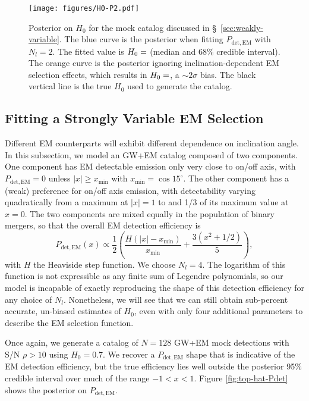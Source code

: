 \documentclass[modern]{aastex631}
\newcommand{\detected}{\mathrm{det}}
\newcommand{\EM}{\mathrm{EM}}
\begin{document}
\begin{figure}
    \texttt{[image: figures/H0-P2.pdf]}
    \caption{Posterior on $H_0$ for the mock catalog discussed in \S\,
    \ref{sec:weakly-variable}.  The blue curve is the posterior when fitting
    $P_{\detected,\EM}$ with $N_l = 2$.  The fitted value is $H_0 =
    \variable{output/H0-P2.txt}$ (median and 68\% credible interval).  The
    orange curve is the posterior ignoring inclination-dependent EM selection
    effects, which results in $H_0 = \variable{output/H0-P2-nofit.txt}$, a $\sim
    2\sigma$ bias.  The black vertical line is the true $H_0$ used to generate
    the catalog.}
    \label{fig:H0-P2}
\end{figure}

\subsection{Fitting a Strongly Variable EM Selection}
\label{sec:strongly-variable}

Different EM counterparts will exhibit different dependence on inclination
angle.  In this subsection, we model an GW+EM catalog composed of two
components.  One component has EM detectable emission only very close to on/off
axis, with $P_{\detected,\EM} = 0$ unless $|x| \geq x_\mathrm{min}$ with
$x_\mathrm{min} = \cos 15^\circ$.  The other component has a (weak) preference
for on/off axis emission, with detectability varying quadratically from a
maximum at $|x| = 1$ to and 1/3 of its maximum value at $x = 0$.  The two
components are mixed equally in the population of binary mergers, so that the
overall EM detection efficiency is 
\begin{equation}
    P_{\detected,\EM}(x) \propto \frac{1}{2} \left( \frac{H\left( |x| - x_\mathrm{min} \right)}{x_\mathrm{min}} + \frac{3 \left( x^2 + 1/2 \right)}{5} \right),
\end{equation}
with $H$ the Heaviside step function.  We choose $N_l = 4$.  The logarithm of
this function is not expressible as any finite sum of Legendre polynomials, so
our model is incapable of exactly reproducing the shape of this detection
efficiency for any choice of $N_l$.  Nonetheless, we will see that we can still
obtain sub-percent accurate, un-biased estimates of $H_0$, even with only four
additional parameters to describe the EM selection function.

Once again, we generate a catalog of $N = 128$ GW+EM mock detections with S/N
$\rho > 10$ using $H_0 = 0.7$.  We recover a $P_{\detected,\EM}$ shape that is
indicative of the EM detection efficiency, but the true efficiency lies well
outside the posterior 95\% credible interval over much of the range $-1 < x <
1$.  Figure \ref{fig:top-hat-Pdet} shows the posterior on $P_{\detected,\EM}$.
\end{document}
